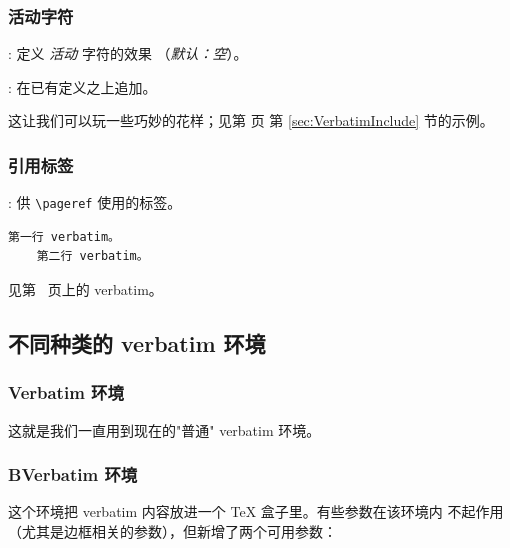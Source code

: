 \documentclass[twoside]{article}
\providecommand\optname[1]{\textsf{#1}}
\newenvironment{optlist}{\begin{description}%
  \renewcommand\makelabel[1]{%
    \descriptionlabel{\mdseries\optname{##1}}}%
  \itemsep0.25\itemsep}%
 {\end{description}}
\begin{document}
\subsubsection{活动字符}

\begin{optlist}
  \item[defineactive (macro)]: 定义 \emph{活动} 字符的效果
  （\emph{默认：空}）。
  \item[defineactive* (macro)]: 在已有定义之上追加。
\end{optlist}

  这让我们可以玩一些巧妙的花样；见第 \pageref{sec:VerbatimInclude} 页
第 \ref{sec:VerbatimInclude} 节的示例。


\subsubsection{引用标签}

\begin{optlist}
  \item[reflabel (<label>)]: 供 \verb|\pageref| 使用的标签。
\end{optlist}

\begin{SideBySideExample}
  \begin{Verbatim}[reflabel=verb0]
    第一行 verbatim。
    第二行 verbatim。
  \end{Verbatim}
  见第~\pageref{verb0} 页上的 verbatim。
\end{SideBySideExample}




\subsection{不同种类的 verbatim 环境}

\subsubsection{Verbatim 环境}

  这就是我们一直用到现在的"普通" verbatim 环境。

\subsubsection{BVerbatim 环境}

  这个环境把 verbatim 内容放进一个 \TeX{} 盒子里。有些参数在该环境内
不起作用（尤其是边框相关的参数），但新增了两个可用参数：
\end{document}
